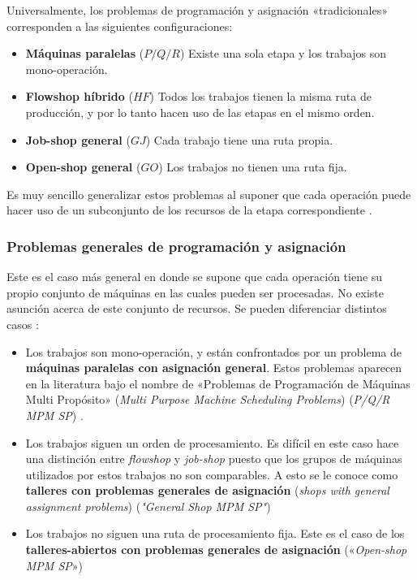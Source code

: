 \documentclass[spanish,draft,12pt,headsepline,footsepline,paper=letter]{scrreprt}
\begin{document}
Universalmente, los problemas de programación y asignación «tradicionales» corresponden a las siguientes configuraciones:
\begin{itemize} 
\item\textbf{Máquinas paralelas} ($P/Q/R$) Existe una sola etapa y los trabajos son mono-operación.
\item\textbf{Flowshop híbrido} ($HF$) Todos los trabajos tienen la misma ruta de producción, y por lo tanto hacen uso de las etapas en el mismo orden.
\item\textbf{Job-shop general} ($GJ$) Cada trabajo tiene una ruta propia.
\item\textbf{Open-shop general} ($GO$) Los trabajos no tienen una ruta fija.
\end{itemize}
Es muy sencillo generalizar estos problemas al suponer que cada operación puede hacer uso de un subconjunto de los recursos de la etapa correspondiente \citep[p.~9]{TKindt2002}.

\subsubsection{Problemas generales de programación y asignación}

Este es el caso más general en donde se supone que cada operación tiene su propio conjunto de máquinas en las cuales pueden ser procesadas. No existe asunción acerca de este conjunto de recursos. Se pueden diferenciar distintos casos \citep[p.~9]{TKindt2002}:

\begin{itemize}
\item Los trabajos son mono-operación, y están confrontados por un problema de \textbf{máquinas paralelas con asignación general}. Estos problemas aparecen en la literatura bajo el nombre de «Problemas de Programación de Máquinas Multi Propósito» (\textit{Multi Purpose Machine Scheduling Problems}) (\textit{P/Q/R MPM SP}) \citep[p.~9]{TKindt2002}.

\item Los trabajos siguen un orden de procesamiento. Es difícil en este caso hace una distinción entre \textit{flowshop} y \textit{job-shop} puesto que los grupos de máquinas utilizados por estos trabajos no son comparables. A esto se le conoce como \textbf{talleres con problemas generales de asignación} (\textit{shops with general assignment problems}) (\textit{"General Shop MPM SP"})

\item Los trabajos no siguen una ruta de procesamiento fija. Este es el caso de los \textbf{talleres-abiertos con problemas generales de asignación} («\textit{Open-shop MPM SP}»)

\end{itemize}
\end{document}
